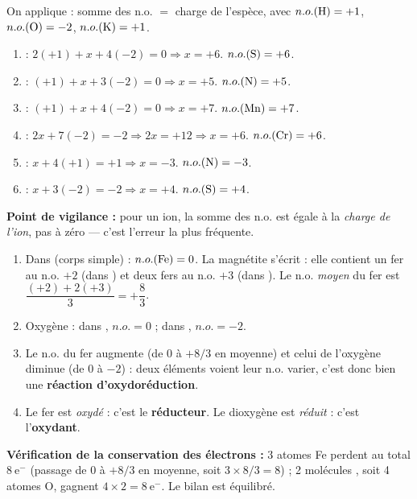 \documentclass[11pt]{article}
\begin{document}
\begin{corrige}
On applique : somme des n.o. $=$ charge de l'espèce, avec $n.o.(\ce{H}) = +1$, $n.o.(\ce{O}) = -2$, $n.o.(\ce{K}) = +1$.
\begin{enumerate}
\item {} : $2(+1) + x + 4(-2) = 0 \Rightarrow x = +6$. $n.o.(\ce{S}) = +6$.
\item {} : $(+1) + x + 3(-2) = 0 \Rightarrow x = +5$. $n.o.(\ce{N}) = +5$.
\item {} : $(+1) + x + 4(-2) = 0 \Rightarrow x = +7$. $n.o.(\ce{Mn}) = +7$.
\item {} : $2x + 7(-2) = -2 \Rightarrow 2x = +12 \Rightarrow x = +6$. $n.o.(\ce{Cr}) = +6$.
\item {} : $x + 4(+1) = +1 \Rightarrow x = -3$. $n.o.(\ce{N}) = -3$.
\item {} : $x + 3(-2) = -2 \Rightarrow x = +4$. $n.o.(\ce{S}) = +4$.
\end{enumerate}
\textbf{Point de vigilance :} pour un ion, la somme des n.o. est égale à la \emph{charge de l'ion}, pas à zéro — c'est l'erreur la plus fréquente.
\end{corrige}

\begin{corrige}
\begin{enumerate}
\item Dans  (corps simple) : $n.o.(\ce{Fe}) = 0$. La magnétite  s'écrit  : elle contient un fer au n.o. $+2$ (dans ) et deux fers au n.o. $+3$ (dans ). Le n.o. \emph{moyen} du fer est $\dfrac{(+2) + 2(+3)}{3} = +\dfrac{8}{3}$.
\item Oxygène : dans , $n.o. = 0$ ; dans , $n.o. = -2$.
\item Le n.o. du fer augmente (de $0$ à $+8/3$ en moyenne) et celui de l'oxygène diminue (de $0$ à $-2$) : deux éléments voient leur n.o. varier, c'est donc bien une \textbf{réaction d'oxydoréduction}.
\item Le fer est \emph{oxydé} : c'est le \textbf{réducteur}. Le dioxygène est \emph{réduit} : c'est l'\textbf{oxydant}.
\end{enumerate}
\textbf{Vérification de la conservation des électrons :} 3 atomes Fe perdent au total $8\ \text{e}^-$ (passage de $0$ à $+8/3$ en moyenne, soit $3 \times 8/3 = 8$) ; 2 molécules , soit 4 atomes O, gagnent $4 \times 2 = 8\ \text{e}^-$. Le bilan est équilibré.
\end{corrige}
\end{document}

